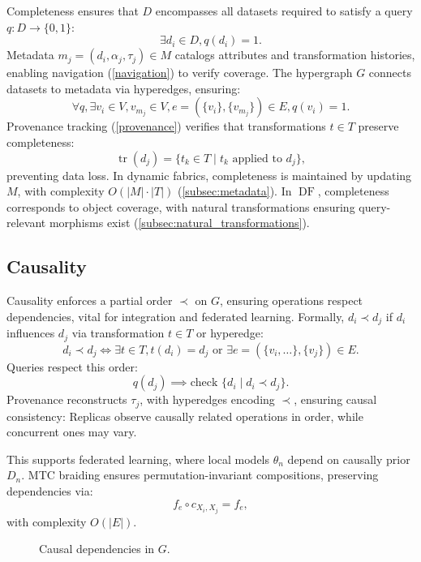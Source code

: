 \documentclass{amsart}
\DeclareMathOperator\DF{DF}
\DeclareMathOperator\tr{tr}
\begin{document}
Completeness ensures that \( D \) encompasses all datasets required to satisfy a query \( q: D \to \{0, 1\} \):
\[
\exists d_i \in D, q(d_i) = 1.
\]
Metadata \( m_j = (d_i, \alpha_j, \tau_j) \in M \) catalogs attributes and transformation histories, enabling navigation (\cref{navigation}) to verify coverage. The hypergraph \( G \) connects datasets to metadata via hyperedges, ensuring:
\[
\forall q, \exists v_i \in V, v_{m_j} \in V, e = (\{v_i\}, \{v_{m_j}\}) \in E, q(v_i) = 1.
\]
Provenance tracking (\cref{provenance}) verifies that transformations \( t \in T \) preserve completeness:
\[
\tr (d_j) = \{ t_k \in T \mid t_k \text{ applied to } d_j \},
\]
preventing data loss. In dynamic fabrics, completeness is maintained by updating \( M \), with complexity \( O(|M| \cdot |T|) \) (\cref{subsec:metadata}). In \( \DF \), completeness corresponds to object coverage, with natural transformations ensuring query-relevant morphisms exist (\cref{subsec:natural_transformations}).

\subsection{Causality} \label{causality}
Causality enforces a partial order \( \prec \) on \( G \), ensuring operations respect dependencies, vital for integration and federated learning. Formally, \( d_i \prec d_j \) if \( d_i \) influences \( d_j \) via transformation \( t \in T \) or hyperedge:
\[
d_i \prec d_j \iff \exists t \in T, t(d_i) = d_j \text{ or } \exists e = (\{v_i, \dots\}, \{v_j\}) \in E.
\]
Queries respect this order:
\[
q(d_j) \implies \text{check } \{d_i \mid d_i \prec d_j\}.
\]
Provenance reconstructs \( \tau_j \), with hyperedges encoding \( \prec \), ensuring causal consistency: Replicas observe causally related operations in order, while concurrent ones may vary.

This supports federated learning, where local models \( \theta_n \) depend on causally prior \( D_n \). MTC braiding ensures permutation-invariant compositions, preserving dependencies via:
\[
f_e \circ c_{X_i, X_j} = f_e,
\]
with complexity \( O(|E|) \).

\begin{figure}[h!]
    \centering
    \caption{Causal dependencies in \( G \).}
    \label{fig:causal_paths}
\end{figure}
\end{document}
